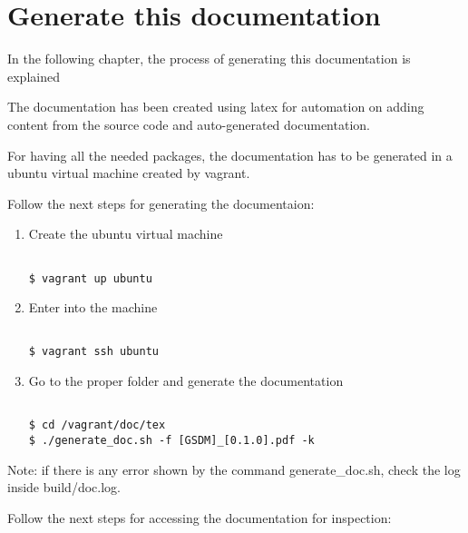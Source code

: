 \chapter{Generate this documentation}

In the following chapter, the process of generating this documentation is explained

The documentation has been created using latex for automation on adding content from the source code and auto-generated documentation.

For having all the needed packages, the documentation has to be generated in a ubuntu virtual machine created by vagrant.

Follow the next steps for generating the documentaion:

\begin{enumerate}

\item Create the ubuntu virtual machine

\begin{lstlisting}[breaklines=true, style=bash]

$ vagrant up ubuntu

\end{lstlisting}

\item Enter into the machine

\begin{lstlisting}[breaklines=true, style=bash]

$ vagrant ssh ubuntu

\end{lstlisting}

\item Go to the proper folder and generate the documentation

\begin{lstlisting}[breaklines=true, style=bash]

$ cd /vagrant/doc/tex
$ ./generate_doc.sh -f [GSDM]_[0.1.0].pdf -k

\end{lstlisting}

\end{enumerate}

Note: if there is any error shown by the command generate\_doc.sh, check the log inside build/doc.log.

Follow the next steps for accessing the documentation for inspection:


